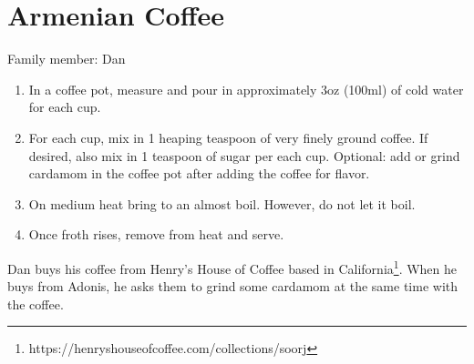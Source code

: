 \chapter{Armenian Coffee}
\label{ch:armeniancoffee}



Family member: Dan

\begin{enumerate}
    \item In a coffee pot, measure and pour in approximately 3oz (100ml) of cold water for each cup.
    \item For each cup, mix in 1 heaping teaspoon of very finely ground coffee. If desired, also mix in 1 teaspoon of sugar per each cup. Optional: add or grind cardamom in the coffee pot after adding the coffee for flavor.
    \item On medium heat bring to an almost boil. However, do not let it boil.
    \item Once froth rises, remove from heat and serve.
\end{enumerate}

Dan buys his coffee from Henry's House of Coffee based in California\footnote{https://henryshouseofcoffee.com/collections/soorj}. When he buys from Adonis, he asks them to grind some cardamom at the same time with the coffee.
